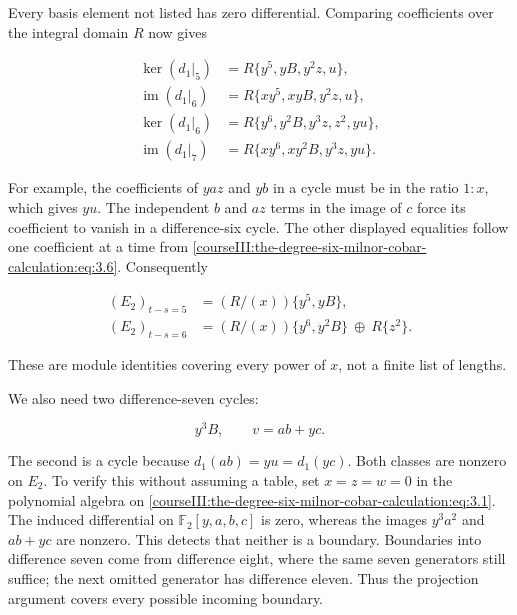 Every basis element not listed has zero differential. Comparing coefficients over the integral domain \(R\) now gives

\begin{equation}
\begin{aligned}
 \ker(d_1|_5)&=R\{y^5,yB,y^2z,u\},\\
 \operatorname{im}(d_1|_6)&=R\{xy^5,xyB,y^2z,u\},\\
 \ker(d_1|_6)&=R\{y^6,y^2B,y^3z,z^2,yu\},\\
 \operatorname{im}(d_1|_7)&=R\{xy^6,xy^2B,y^3z,yu\}.
\end{aligned}
\label{courseIII:the-degree-six-milnor-cobar-calculation:eq:3.7}
\end{equation}

For example, the coefficients of \(yaz\) and \(yb\) in a cycle must be in the ratio \(1:x\), which gives \(yu\). The independent \(b\) and \(az\) terms in the image of \(c\) force its coefficient to vanish in a difference-six cycle. The other displayed equalities follow one coefficient at a time from \eqref{courseIII:the-degree-six-milnor-cobar-calculation:eq:3.6}. Consequently

\begin{equation}
\begin{aligned}
 (E_2)_{t-s=5}
   &=(R/(x))\{y^5,yB\},\\
 (E_2)_{t-s=6}
   &=(R/(x))\{y^6,y^2B\}\ \oplus\ R\{z^2\}.
\end{aligned}
\label{courseIII:the-degree-six-milnor-cobar-calculation:eq:3.8}
\end{equation}

These are module identities covering every power of \(x\), not a finite list of lengths.

We also need two difference-seven cycles:

\begin{equation}
y^3B,\qquad v=ab+yc.
 \label{courseIII:the-degree-six-milnor-cobar-calculation:eq:3.9}
\end{equation}

The second is a cycle because \(d_1(ab)=yu=d_1(yc)\). Both classes are nonzero on \(E_2\). To verify this without assuming a table, set \(x=z=w=0\) in the polynomial algebra on \eqref{courseIII:the-degree-six-milnor-cobar-calculation:eq:3.1}. The induced differential on \(\mathbb F _2[y,a,b,c]\) is zero, whereas the images \(y^3a^2\) and \(ab+yc\) are nonzero. This detects that neither is a boundary. Boundaries into difference seven come from difference eight, where the same seven generators still suffice; the next omitted generator has difference eleven. Thus the projection argument covers every possible incoming boundary.

